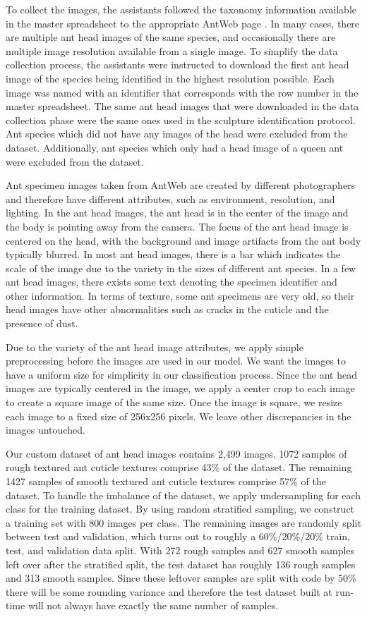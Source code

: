 \documentclass{aci}
\numberwithin{equation}{section}
\begin{document}
To collect the images, the assistants followed the taxonomy information
available in the master spreadsheet to the appropriate AntWeb page
\cite{perrichot_antweb_2012}. In many cases, there are multiple ant head images
of the same species, and occasionally there are multiple image resolution
available from a single image. To simplify the data collection process, the
assistants were instructed to download the first ant head image of the species
being identified in the highest resolution possible. Each image was named with
an identifier that corresponds with the row number in the master spreadsheet.
The same ant head images that were downloaded in the data collection phase were
the same ones used in the sculpture identification protocol. Ant species which
did not have any images of the head were excluded from the dataset.
Additionally, ant species which only had a head image of a queen ant were
excluded from the dataset.

Ant specimen images taken from AntWeb \cite{perrichot_antweb_2012} are created
by different photographers and therefore have different attributes, such as
environment, resolution, and lighting. In the ant head images, the ant head is
in the center of the image and the body is pointing away from the camera. The
focus of the ant head image is centered on the head, with the background and
image artifacts from the ant body typically blurred. In most ant head images,
there is a bar which indicates the scale of the image due to the variety in the
sizes of different ant species. In a few ant head images, there exists some text
denoting the specimen identifier and other information. In terms of texture,
some ant specimens are very old, so their head images have other abnormalities
such as cracks in the cuticle and the presence of dust.

Due to the variety of the ant head image attributes, we apply simple
preprocessing before the images are used in our model. We want the images to
have a uniform size for simplicity in our classification process. Since the ant
head images are typically centered in the image, we apply a center crop to each
image to create a square image of the same size. Once the image is square, we
resize each image to a fixed size of 256x256 pixels. We leave other
discrepancies in the images untouched.

Our custom dataset of ant head images contains 2,499 images. 1072 samples of
rough textured ant cuticle textures comprise 43\% of the dataset. The remaining
1427 samples of smooth textured ant cuticle textures comprise 57\% of the
dataset. To handle the imbalance of the dataset, we apply undersampling for each
class for the training dataset. By using random stratified sampling, we
construct a training set with 800 images per class. The remaining images are
randomly split between test and validation, which turns out to roughly a
60\%/20\%/20\% train, test, and validation data split. With 272 rough samples
and 627 smooth samples left over after the stratified split, the test dataset
has roughly 136 rough samples and 313 smooth samples. Since these leftover
samples are split with code by 50\% there will be some rounding variance and
therefore the test dataset built at run-time will not always have exactly the
same number of samples.
\end{document}
